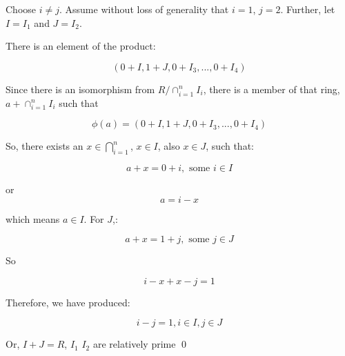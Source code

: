 \documentclass[11pt,oneside]{article}
\numberwithin{equation}{section}
\theoremstyle{definition}
\newtheorem{exercise}{Exercise}
\begin{document}
\begin{solution}

  Choose $ i \neq j$.  Assume without loss of generality that $i=1$,
  $j=2$.  Further, let $I = I_1$ and $J = I_2$.

  There is an element of the product:

  \[
  (0 + I, 1 + J, 0 + I_3, ... , 0 + I_4)
  \]

  Since there is an isomorphism from  $R/\cap_{i=1}^n I_i$,
  there is a member of that ring, $a + \cap_{i=1}^n I_i$ such that

  \[
  \phi(a) =   (0 + I, 1 + J, 0 + I_3, ... , 0 + I_4)
  \]
  
  So, there exists an $x \in \bigcap \limits _{i=1} ^ n$, $x \in I$, also $x \in J$, such that:

  \[
  a + x = 0 + i, \textrm{ some } i \in I
  \]

  or
  \[
  a = i - x
  \]
  
  which means $a \in I$.  For $J$,:

  \[
  a + x = 1 + j, \textrm{ some } j \in J
  \]
  
  So

  \[
  i - x + x - j = 1
  \]

  Therefore, we have produced:

  \[
  i - j = 1, i \in I, j \in J
  \]

  Or, $I + J = R$, $I_1$ $I_2$ are relatively prime
  \qed

\end{solution}

\begin{comment}
  \begin{exercise}
    problem
  \end{exercise}
  \begin{solution}
    \begin{enumerate}[(a)]
    \item
      first answer
    \end{enumerate}
  \end{solution}
\end{comment}
\end{document}
